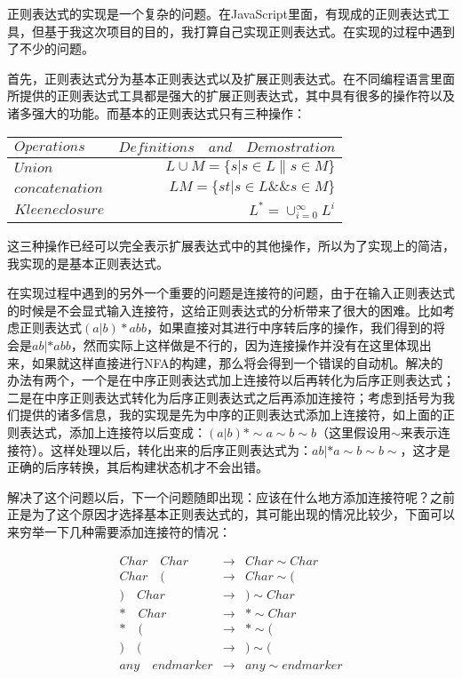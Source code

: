 正则表达式的实现是一个复杂的问题。在JavaScript里面，有现成的正则表达式工具，但基于我这次项目的目的，我打算自己实现正则表达式。在实现的过程中遇到了不少的问题。

首先，正则表达式分为基本正则表达式以及扩展正则表达式。在不同编程语言里面所提供的正则表达式工具都是强大的扩展正则表达式，其中具有很多的操作符以及诸多强大的功能。而基本的正则表达式只有三种操作：

\begin{tabular}{l|r}
    $Operations$     & $Definitions\quad and\quad Demostration$ \\
    \hline
    $Union$          & $L \cup M = \{s|s \in L \| s \in M\}$  \\
    $concatenation$  & $LM = \{st|s \in L \&\& s \in M\}$  \\
    $Kleene closure$ & $L^* = \cup^\infty_{i=0} L^i$  \\
\end{tabular}

这三种操作已经可以完全表示扩展表达式中的其他操作，所以为了实现上的简洁，我实现的是基本正则表达式。

在实现过程中遇到的另外一个重要的问题是连接符的问题，由于在输入正则表达式的时候是不会显式输入连接符，这给正则表达式的分析带来了很大的困难。比如考虑正则表达式$(a|b)*abb$，如果直接对其进行中序转后序的操作，我们得到的将会是$ab|*abb$，然而实际上这样做是不行的，因为连接操作并没有在这里体现出来，如果就这样直接进行NFA的构建，那么将会得到一个错误的自动机。解决的办法有两个，一个是在中序正则表达式加上连接符以后再转化为后序正则表达式；二是在中序正则表达式转化为后序正则表达式之后再添加连接符；考虑到括号为我们提供的诸多信息，我的实现是先为中序的正则表达式添加上连接符，如上面的正则表达式，添加上连接符以后变成：$(a|b)*\sim a\sim b\sim b$（这里假设用$\sim$来表示连接符）。这样处理以后，转化出来的后序正则表达式为：$ab|*a\sim b\sim b\sim$，这才是正确的后序转换，其后构建状态机才不会出错。

解决了这个问题以后，下一个问题随即出现：应该在什么地方添加连接符呢？之前正是为了这个原因才选择基本正则表达式的，其可能出现的情况比较少，下面可以来穷举一下几种需要添加连接符的情况：

\begin{eqnarray*}
    Char \quad Char & \rightarrow & Char \sim Char \\
    Char \quad (    & \rightarrow & Char \sim ( \\
    ) \quad Char    & \rightarrow & ) \sim Char \\
    * \quad Char    & \rightarrow & * \sim Char \\
    * \quad (       & \rightarrow & * \sim ( \\
    ) \quad (       & \rightarrow & ) \sim ( \\
    any \quad endmarker & \rightarrow & any \sim endmarker \\
\end{eqnarray*}

